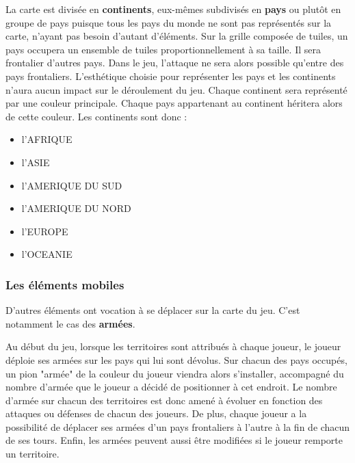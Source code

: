 La carte est divisée en \textbf{continents}, eux-mêmes subdivisés en \textbf{pays} ou plutôt en groupe de pays puisque tous les pays du monde ne sont pas représentés sur la carte, n'ayant pas besoin d'autant d'éléments. Sur la grille composée de tuiles, un pays occupera un ensemble de tuiles proportionnellement à sa taille. Il sera frontalier d'autres pays. Dans le jeu, l'attaque ne sera alors possible qu'entre des pays frontaliers. L'esthétique choisie pour représenter les pays et les continents n'aura aucun impact sur le déroulement du jeu. Chaque continent sera représenté par une couleur principale. Chaque pays appartenant au continent héritera alors de cette couleur. 
\newline
\newline 
Les continents sont donc :
\begin{itemize}
    \item l'AFRIQUE
    \item l'ASIE
    \item l'AMERIQUE DU SUD 
    \item l'AMERIQUE DU NORD 
    \item l'EUROPE 
    \item l'OCEANIE \newline
\end{itemize}



\subsubsection{Les éléments mobiles}

D'autres éléments ont vocation à se déplacer sur la carte du jeu. C'est notamment le cas des \textbf{armées}. 
\newline 

Au début du jeu, lorsque les territoires sont attribués à chaque joueur, le joueur déploie ses armées sur les pays qui lui sont dévolus. Sur chacun des pays occupés, un pion "armée" de la couleur du joueur viendra alors s'installer, accompagné du nombre d'armée que le joueur a décidé de positionner à cet endroit. Le nombre d'armée sur chacun des territoires est donc amené à évoluer en fonction des attaques ou défenses de chacun des joueurs. De plus, chaque joueur a la possibilité de déplacer ses armées d'un pays frontaliers à l'autre à la fin de chacun de ses tours. Enfin, les armées peuvent aussi être modifiées si le joueur remporte un territoire. 


